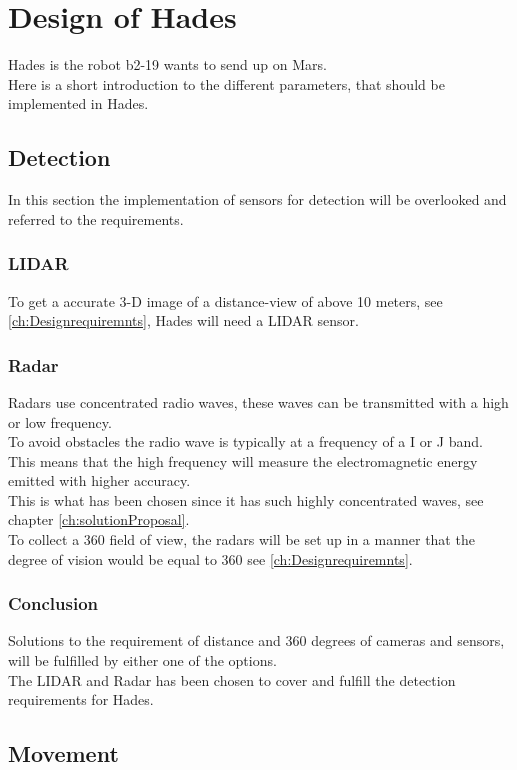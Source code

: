 \chapter{Design of Hades}
Hades is the robot b2-19 wants to send up on Mars.\\
Here is a short introduction to the different parameters, that should be implemented in Hades.

\section{Detection} \label{ch:detectionHades}
In this section the implementation of sensors for detection will be overlooked and referred to the requirements.

\subsection{LIDAR}
To get a accurate 3-D image of a distance-view of above 10 meters, see \ref{ch:Designrequiremnts}, Hades will need a LIDAR sensor.

\subsection{Radar}
Radars use concentrated radio waves, these waves can be transmitted with a high or low frequency.\\ 
To avoid obstacles the radio wave is typically at a frequency of a I or J band. This means that the high frequency will measure the electromagnetic energy emitted with higher accuracy.\\
This is what has been chosen since it has such highly concentrated waves, see chapter \ref{ch:solutionProposal}.\\
To collect a 360 field of view, the radars will be set up in a manner that the degree of vision would be equal to 360 see \ref{ch:Designrequiremnts}.


\subsection{Conclusion}
Solutions to the requirement of distance and 360 degrees of cameras and sensors, will be fulfilled by either one of the options.\\
The LIDAR and Radar has been chosen to cover and fulfill the detection requirements for Hades.

\section{Movement} \label{ch:MovementHades}

